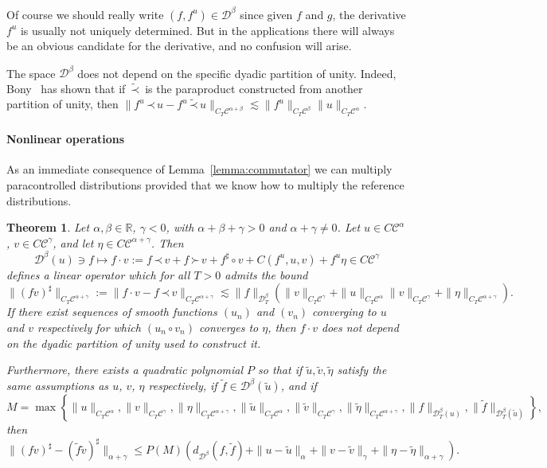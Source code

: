 \documentclass[a4paper,11pt]{article}
\newcommand{\assign}{:=}
\newcommand{\cdummy}{\cdot}
\newtheorem{theorem}{Theorem}
\newcommand{\CC}{\mathscr{C}}
\newcommand{\CD}{\mathscr{D}}
\newcommand{\DD}{\mathscr{D}}
\newcommand{\lpara}{\,\mathord{\prec}\,}
\newcommand{\rpara}{\,\mathord{\succ}\,}
\newcommand{\reso}{\,\mathord{\circ}\,}
\begin{document}
Of course we should really write $(f, f^u) \in \CD^{\beta}$ since given $f$
and $g$, the derivative $f^u$ is usually not uniquely determined. But in the
applications there will always be an obvious candidate for the derivative, and
no confusion will arise.

\begin{remark}
  The space $\CD^{\beta}$ does not depend on the specific dyadic partition of
  unity. Indeed, Bony~{\cite{Bony1981}} has shown that if $\tilde{\lpara}$ is
  the paraproduct constructed from another partition of unity, then $\| f^u
  \lpara u - f^u \tilde{\lpara} u \|_{C_T \CC^{\alpha + \beta}} \lesssim \| f^u
  \|_{C_T \CC^{\beta}} \| u \|_{C_T \CC^{\alpha}}$.
\end{remark}

\paragraph{Nonlinear operations}As an immediate consequence of
Lemma~\ref{lemma:commutator} we can multiply paracontrolled distributions
provided that we know how to multiply the reference distributions.

\begin{theorem}
  \label{thm:paracontrolled product}Let $\alpha, \beta \in \mathbb{R}$,
  $\gamma < 0$, with $\alpha + \beta + \gamma > 0$ and $\alpha + \gamma \neq
  0$. Let $u \in C \CC^{\alpha}$, $v \in C \CC^{\gamma}$, and let $\eta \in C
  \CC^{\alpha + \gamma}$. Then
  \[ \DD^{\beta} (u) \ni f \mapsto f \cdummy v \assign f \lpara v + f \rpara v +
     f^{\sharp} \reso v + C (f^u, u, v) + f^u \eta \in C \CC^{\gamma} \]
  defines a linear operator which for all $T > 0$ admits the bound
  \[ \| (f v)^{\sharp} \|_{C_T \CC^{\alpha + \gamma}} \assign \| f \cdummy v -
     f \lpara v \|_{C_T \CC^{\alpha + \gamma}} \lesssim \| f \|_{\CD^{\beta}_T}
     \left( \| v \|_{C_T \CC^{\gamma}} + \| u \|_{C_T \CC^{\alpha}} \| v
     \|_{C_T \CC^{\gamma}} + \| \eta \|_{C_T \CC^{\alpha + \gamma}} \right) .
  \]
  If there exist sequences of smooth functions $(u_n)$ and $(v_n)$ converging
  to $u$ and $v$ respectively for which $(u_n \reso v_n)$ converges to $\eta$,
  then $f \cdummy v$ does not depend on the dyadic partition of unity used to
  construct it.
  
  Furthermore, there exists a quadratic polynomial $P$ so that if $\tilde{u},
  \tilde{v}, \tilde{\eta}$ satisfy the same assumptions as $u$, $v$, $\eta$
  respectively, if $\tilde{f} \in \CD^{\beta} (\tilde{u})$, and if
  \[ M = \max \left\{ \| u \|_{C_T \CC^{\alpha}}, \| v \|_{C_T \CC^{\gamma}},
     \| \eta \|_{C_T \CC^{\alpha + \gamma}}, \| \tilde{u} \|_{C_T
     \CC^{\alpha}}, \| \tilde{v} \|_{C_T \CC^{\gamma}}, \| \tilde{\eta}
     \|_{C_T \CC^{\alpha + \gamma}}, \|f\|_{\DD^{\beta}_T (u)}, \| \tilde{f}
     \|_{\DD^{\beta}_T (\tilde{u})} \right\}, \]
  then
  \[ \| (f v)^{\sharp} - (\tilde{f} \tilde{v})^{\sharp} \|_{\alpha + \gamma}
     \leqslant P (M) \left( d_{\DD^{\beta}} (f, \tilde{f}) +\|u - \tilde{u}
     \|_{\alpha} +\|v - \tilde{v} \|_{\gamma} +\| \eta - \tilde{\eta}
     \|_{\alpha + \gamma} \right) . \]
\end{theorem}
\end{document}
